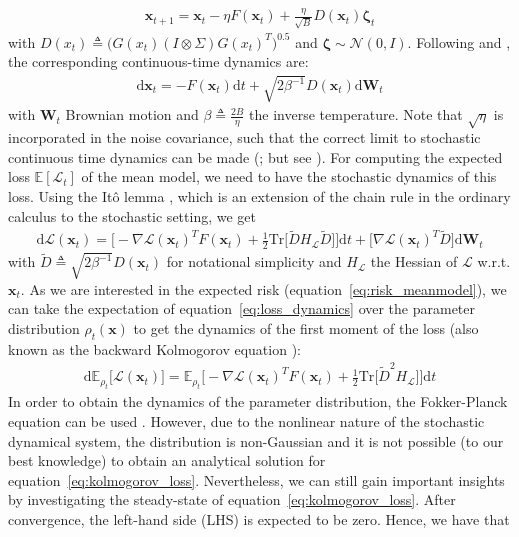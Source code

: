 \documentclass{article} \usepackage{iclr2021_conference,times}
\def\eqref#1{equation~\ref{#1}}
\begin{document}
\begin{align}
    \mathbf{x}_{t+1} = \mathbf{x}_t - \eta F(\mathbf{x}_t) + \frac{\eta}{\sqrt{B}} D(\mathbf{x}_t) \boldsymbol{\zeta}_t
\end{align}
with $D(x_t) \triangleq \big(G(x_t)(I \otimes \Sigma )G(x_t)^T\big)^{0.5}$ and $\boldsymbol{\zeta} \sim \mathcal{N}(0, I)$. Following \cite{liu_deep_2019} and \cite{chaudhari_stochastic_2018}, the corresponding continuous-time dynamics are:
\begin{align}
    \text{d}\mathbf{x}_t = -F(\mathbf{x}_t)\text{d}t + \sqrt{2\beta^{-1}} D(\mathbf{x}_t)\text{d}\mathbf{W}_t
\end{align}
with $\mathbf{W}_t$ Brownian motion and $\beta \triangleq \frac{2B}{\eta}$ the inverse temperature. 
Note that $\sqrt{\eta}$ is incorporated in the noise covariance, such that the correct limit to stochastic continuous time dynamics can be made (\citealp{liu_deep_2019, chaudhari_stochastic_2018}; but see \citealp{yaida_fluctuation-dissipation_2018}). 
For computing the expected loss $\mathbb{E}[\mathcal{L}_t]$ of the mean model, we need to have the stochastic dynamics of this loss. Using the Itô lemma \citep{ito_stochastic_1951, liu_deep_2019}, which is an extension of the chain rule in the ordinary calculus to the stochastic setting, we get
\begin{align}\label{eq:loss_dynamics}
    \text{d}\mathcal{L}(\mathbf{x}_t) = \Big[-\nabla \mathcal{L}(\mathbf{x}_t)^T F(\mathbf{x}_t) + \frac{1}{2} \text{Tr}\big[\tilde{D}H_{\mathcal{L}}\tilde{D}\big]\Big] \text{d}t + \big[\nabla \mathcal{L}(\mathbf{x}_t)^T \tilde{D}\big] \text{d}\mathbf{W}_t
\end{align}
with $\tilde{D} \triangleq \sqrt{2\beta^{-1}} D(\mathbf{x}_t)$ for notational simplicity and $H_{\mathcal{L}}$ the Hessian of $\mathcal{L}$ w.r.t. $\mathbf{x}_t$. As we are interested in the expected risk (\eqref{eq:risk_meanmodel}), we can take the expectation of \eqref{eq:loss_dynamics} over the parameter distribution $\rho_t(\mathbf{x})$ to get the dynamics of the first moment of the loss (also known as the backward Kolmogorov equation \citep{kolmogorov_analytical_1931}): 
\begin{align}\label{eq:kolmogorov_loss}
    \text{d} \mathbb{E}_{\rho_t}\big[\mathcal{L}(\mathbf{x}_t)\big] = \mathbb{E}_{\rho_t} \Big[-\nabla \mathcal{L}(\mathbf{x}_t)^T F(\mathbf{x}_t) + \frac{1}{2} \text{Tr}\big[\tilde{D}^2H_{\mathcal{L}}\big]\Big] \text{d}t
\end{align}
In order to obtain the dynamics of the parameter distribution, the Fokker-Planck equation can be used \citep{jordan_variational_1998}. However, due to the nonlinear nature of the stochastic dynamical system, the distribution is non-Gaussian and it is not possible (to our best knowledge) to obtain an analytical solution for \eqref{eq:kolmogorov_loss}. Nevertheless, we can still gain important insights by investigating the steady-state of \eqref{eq:kolmogorov_loss}. After convergence, the left-hand side (LHS) is expected to be zero. Hence, we have that 
\end{document}

